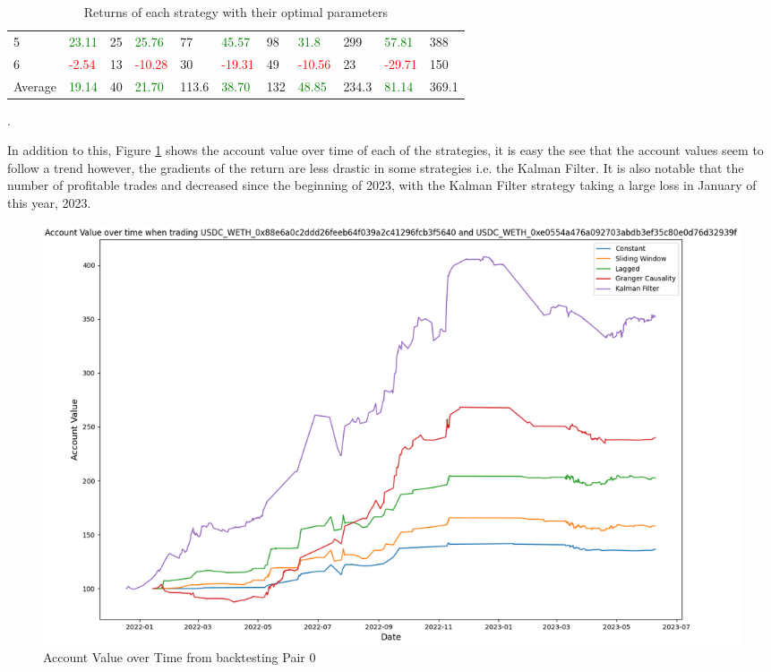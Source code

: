 \begin{table}[H]
\begin{adjustwidth}{-0.8in}{-0.9in}
\begin{tabular}{|p{4em}|p{3em}|p{3em}|p{3em}|p{3em}|p{3em}|p{3em}|p{3em}|p{3em}|p{3em}|p{3em}|}
            5 & \textcolor{green}{23.11} & 25 & \textcolor{green}{25.76} & 77 & \textcolor{green}{45.57} & 98 & \textcolor{green}{31.8} & 299 & \textcolor{green}{57.81} & 388\\\cline{2-11}
            6 & \textcolor{red}{-2.54} & 13 & \textcolor{red}{-10.28} & 30 & \textcolor{red}{-19.31} & 49 & \textcolor{red}{-10.56} & 23 & \textcolor{red}{-29.71} & 150\\\hline\hline           
            Average & \textcolor{green}{19.14} & 40 & \textcolor{green}{21.70} & 113.6 & \textcolor{green}{38.70} & 132 & \textcolor{green}{48.85} & 234.3 & \textcolor{green}{81.14} & 369.1\\\hline                       
        \end{tabular}
    \end{adjustwidth}
    \caption{Returns of each strategy with their optimal parameters \label{tab:FinalResults}}.
\end{table}

\noindent In addition to this, Figure \ref{fig:ValueHistory} shows the account value over time of each of the strategies, it is easy the see that the account values seem to follow a trend however, the gradients of the return are less drastic in some strategies i.e. the Kalman Filter. It is also notable that the number of profitable trades and decreased since the beginning of 2023, with the Kalman Filter strategy taking a large loss in January of this year, 2023.

\begin{figure}[H]
    \centering
    \includegraphics[width=\linewidth]{evaluation/Images/ValueHistory.png}
    \caption{Account Value over Time from backtesting Pair 0}
    \label{fig:ValueHistory}
\end{figure}


